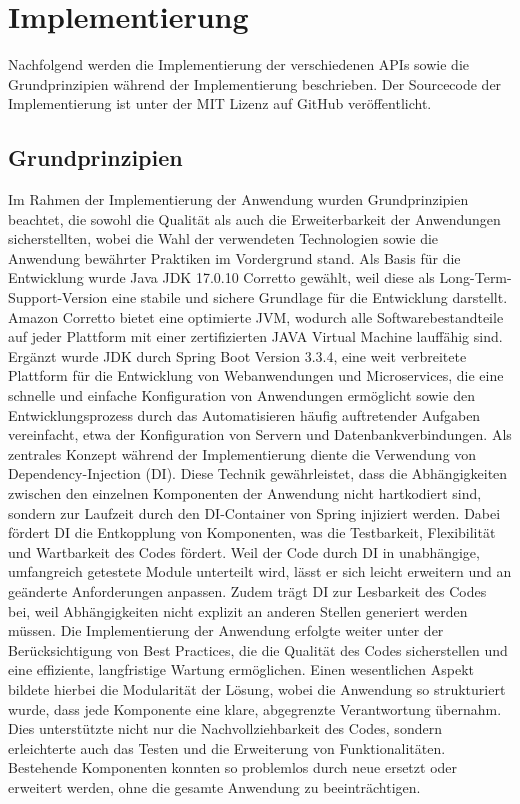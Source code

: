 \chapter{Implementierung} %
\label{sec:implementierung}
Nachfolgend werden die Implementierung der verschiedenen APIs sowie die Grundprinzipien während der Implementierung beschrieben. Der Sourcecode der Implementierung ist unter der MIT Lizenz auf GitHub veröffentlicht. \citep{me}
\section{Grundprinzipien} %
\label{sec:prinzipien}
Im Rahmen der Implementierung der Anwendung wurden Grundprinzipien beachtet, die sowohl die Qualität als auch die Erweiterbarkeit der Anwendungen sicherstellten, wobei die Wahl der verwendeten Technologien sowie die Anwendung bewährter Praktiken im Vordergrund stand. Als Basis für die Entwicklung wurde Java JDK 17.0.10 Corretto gewählt, weil diese als Long-Term-Support-Version eine stabile und sichere Grundlage für die Entwicklung darstellt. Amazon Corretto bietet eine optimierte JVM, wodurch alle Softwarebestandteile auf jeder Plattform mit einer zertifizierten JAVA Virtual Machine lauffähig sind. Ergänzt wurde JDK durch Spring Boot Version 3.3.4, eine weit verbreitete Plattform für die Entwicklung von Webanwendungen und Microservices, die eine schnelle und einfache Konfiguration von Anwendungen ermöglicht sowie den Entwicklungsprozess durch das Automatisieren häufig auftretender Aufgaben vereinfacht, etwa der Konfiguration von Servern und Datenbankverbindungen. Als zentrales Konzept während der Implementierung diente die Verwendung von Dependency-Injection (DI). Diese Technik gewährleistet, dass die Abhängigkeiten zwischen den einzelnen Komponenten der Anwendung nicht hartkodiert sind, sondern zur Laufzeit durch den DI-Container von Spring injiziert werden. Dabei fördert DI die Entkopplung von Komponenten, was die Testbarkeit, Flexibilität und Wartbarkeit des Codes fördert. Weil der Code durch DI in unabhängige, umfangreich getestete Module unterteilt wird, lässt er sich leicht erweitern und an geänderte Anforderungen anpassen. Zudem trägt DI zur Lesbarkeit des Codes bei, weil Abhängigkeiten nicht explizit an anderen Stellen generiert werden müssen. Die Implementierung der Anwendung erfolgte weiter unter der Berücksichtigung von Best Practices, die die Qualität des Codes sicherstellen und eine effiziente, langfristige Wartung ermöglichen. Einen wesentlichen Aspekt bildete hierbei die Modularität der Lösung, wobei die Anwendung so strukturiert wurde, dass jede Komponente eine klare, abgegrenzte Verantwortung übernahm. Dies unterstützte nicht nur die Nachvollziehbarkeit des Codes, sondern erleichterte auch das Testen und die Erweiterung von Funktionalitäten. Bestehende Komponenten konnten so problemlos durch neue ersetzt oder erweitert werden, ohne die gesamte Anwendung zu beeinträchtigen.




